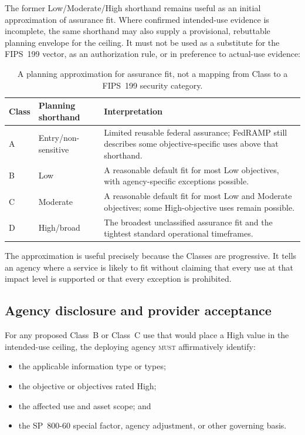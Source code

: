 \documentclass[11pt]{article}
\newcommand{\rfckw}[1]{\textsc{#1}}
\begin{document}
The former Low/Moderate/High shorthand remains useful as an initial approximation
of assurance fit. Where confirmed intended-use evidence is incomplete, the same
shorthand may also supply a provisional, rebuttable planning envelope for the
ceiling. It must not be used as a substitute for the FIPS~199 vector, as an
authorization rule, or in preference to actual-use evidence:

\begin{table}[H]
\centering
\small
\renewcommand{\arraystretch}{1.18}
\begin{tabularx}{0.96\textwidth}{@{}P{0.13\textwidth}P{0.24\textwidth}Y@{}}
\toprule
\textbf{Class} & \textbf{Planning shorthand} & \textbf{Interpretation} \\
\midrule
A & Entry/non-sensitive & Limited reusable federal assurance; FedRAMP still
describes some objective-specific uses above that shorthand. \\
B & Low & A reasonable default fit for most Low objectives, with agency-specific
exceptions possible. \\
C & Moderate & A reasonable default fit for most Low and Moderate objectives; some
High-objective uses remain possible. \\
D & High/broad & The broadest unclassified assurance fit and the tightest standard
operational timeframes. \\
\bottomrule
\end{tabularx}
\caption{A planning approximation for assurance fit, not a mapping from Class to a
FIPS~199 security category.}
\label{tab:class-fit}
\end{table}

The approximation is useful precisely because the Classes are progressive. It
tells an agency where a service is likely to fit without claiming that every use
at that impact level is supported or that every exception is prohibited.

\subsection{Agency disclosure and provider acceptance}

For any proposed Class~B or Class~C use that would place a High value in the
intended-use ceiling, the deploying agency \rfckw{must} affirmatively identify:

\begin{itemize}[leftmargin=1.5em]
\item the applicable information type or types;
\item the objective or objectives rated High;
\item the affected use and asset scope; and
\item the SP~800-60 special factor, agency adjustment, or other governing basis.
\end{itemize}
\end{document}

